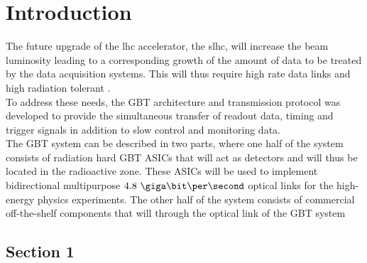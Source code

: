 \documentclass[main.tex]{subfiles}
\begin{document}
\chapter{Introduction}

The future upgrade of the \gls{lhc} accelerator, the \gls{slhc}, will increase the beam luminosity leading to a corresponding growth of the amount of data to be treated by the data acquisition systems. This will thus require high rate data links and high radiation tolerant .\\
To address these needs, the GBT architecture and transmission protocol was developed to provide the simultaneous transfer of readout data, timing and trigger signals in addition to slow control and monitoring data. \\
The GBT system can be described in two parts, where one half of the system consists of radiation hard GBT ASICs that will act as detectors and will thus be located in the radioactive zone. These ASICs will be used to implement bidirectional multipurpose $4.8\ \giga\bit\per\second$ optical links for the high-energy physics experiments. The other half of the system consists of commercial off-the-shelf components that will through the optical link of the GBT system 


\section{Section 1}
\end{document}
